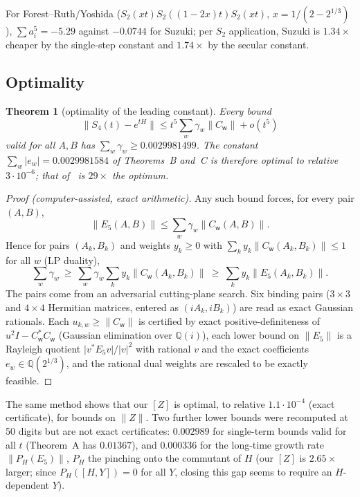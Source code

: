 \documentclass[11pt]{article}
\newcommand{\norm}[1]{\lVert #1\rVert}
\newcommand{\abs}[1]{\lvert #1\rvert}
\newcommand{\Q}{\mathbb{Q}}
\newcommand{\Qc}{\mathbb{Q}(2^{1/3})}
\newcommand{\C}[1]{C_{\mathsf{#1}}}
\newcommand{\lb}[1]{[#1]}
\theoremstyle{plain}
\newtheorem{theorem}{Theorem}
\theoremstyle{definition}
\theoremstyle{remark}
\begin{document}
For Forest--Ruth/Yoshida ($S_2(xt)S_2((1-2x)t)S_2(xt)$, $x=1/(2-2^{1/3})$), $\sum a_i^5=-5.29$ against
$-0.0744$ for Suzuki; per $S_2$ application, Suzuki is $1.34\times$ cheaper by the single-step constant
and $1.74\times$ by the secular constant.

\subsection{Optimality}

\begin{theorem}[optimality of the leading constant]\label{thm:E}
Every bound
\[
\norm{S_4(t)-e^{tH}}\le t^5\sum_w\gamma_w\norm{\C w}+o(t^5)
\]
valid for all $A,B$ has $\sum_w\gamma_w\ge0.0029981499$. The constant $\sum_w\abs{e_w}=0.0029981584$ of Theorems~B and~C
is therefore optimal to relative $3\cdot10^{-6}$; that of~\cite{Childs2021} is $29\times$ the optimum.
\end{theorem}

\begin{proof}[Proof (computer-assisted, exact arithmetic)]
Any such bound forces, for every pair $(A,B)$,
\[
\norm{E_5(A,B)}\le\sum_w\gamma_w\norm{\C w(A,B)} .
\]
Hence for pairs $(A_k,B_k)$ and weights $y_k\ge0$ with $\sum_ky_k\norm{\C w(A_k,B_k)}\le1$ for all $w$
(LP duality),
\[
\sum_w\gamma_w\ \ge\ \sum_w\gamma_w\sum_ky_k\norm{\C w(A_k,B_k)}\ \ge\ \sum_ky_k\norm{E_5(A_k,B_k)} .
\] The pairs come from an adversarial
cutting-plane search. Six binding pairs ($3\times3$ and $4\times4$ Hermitian matrices, entered as
$(iA_k,iB_k)$) are read as exact Gaussian rationals. Each $u_{k,w}\ge\norm{\C w}$ is certified by exact
positive-definiteness of $u^2I-\C w^*\C w$ (Gaussian elimination over $\Q(i)$), each lower bound on
$\norm{E_5}$ is a Rayleigh quotient $\abs{v^*E_5v}/\abs v^2$ with rational $v$ and the exact
coefficients $e_w\in\Qc$,
and the rational dual weights are rescaled to be exactly feasible.
\end{proof}

The same method shows that our $\lb Z$ is optimal, to relative $1.1\cdot10^{-4}$ (exact certificate), for
bounds on $\norm Z$. Two further lower bounds were recomputed at 50 digits but are not exact certificates:
$0.002989$ for single-term bounds valid for all $t$ (Theorem~A has $0.01367$), and $0.000336$ for the
long-time growth rate $\norm{P_H(E_5)}$, $P_H$ the pinching onto the commutant of $H$ (our $\lb Z$ is
$2.65\times$ larger; since $P_H([H,Y])=0$ for all $Y$, closing this gap seems to require an
$H$-dependent $Y$).
\end{document}
